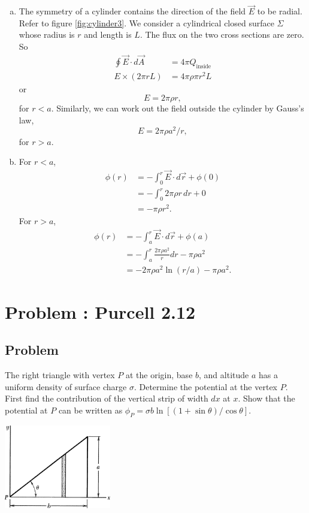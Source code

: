 \documentclass[solutions]{esg8022pset}
\begin{document}
  \begin{enumerate}[(a)]
    \item The symmetry of a cylinder contains the direction of the field
      $\vec{E}$ to be radial.  Refer to figure \ref{fig:cylinder3}.  We
      consider a cylindrical closed surface $\Sigma$ whose radius is $r$ and
      length is $L$.  The flux on the two cross sections are zero.  So
      \begin{align*}
        \oint \vec{E}\cdot d\vec{A} & = 4\pi Q_{\text{inside}}\\
        E\times(2\pi rL) & = 4\pi\rho\pi r^2L
      \end{align*}
      or
      \begin{equation*}
      E=2\pi\rho r,
      \end{equation*}
      for $r<a$.  Similarly, we can work out the field outside the cylinder
      by Gauss's law,
      \begin{equation*}
      E=2\pi\rho a^2/r,
      \end{equation*}
      for $r>a$.
    \item For $r<a$,
      \begin{align*}
        \phi(r) & = -\int_0^r\vec{E}\cdot d\vec{r}+\phi(0)\\
                & = -\int_0^r 2\pi\rho r\,dr+0\\
                & = -\pi\rho r^2.
      \end{align*}
      For $r>a$,
      \begin{align*}
        \phi(r) & = -\int_a^r \vec{E}\cdot d\vec{r}+\phi(a)\\
                & = -\int_a^r\frac{2\pi\rho a^2}{r}dr-\pi\rho a^2\\
                & = -2\pi\rho a^2\ln{(r/a)}-\pi\rho a^2.
      \end{align*}
  \end{enumerate}
\section{Problem \thesection: Purcell 2.12}
\subsection{Problem}
  The right triangle with vertex $P$ at the origin, base $b$, and altitude $a$ has a uniform density of surface charge $\sigma$. Determine the potential at the vertex $P$. First find the contribution of the vertical strip of width $dx$ at $x$. Show that the potential at $P$ can be written as $\phi_P = \sigma b \ln[(1 + \sin \theta) / \cos \theta]$.
  \begin{center}\includegraphics[width=0.35\textwidth]{ps02_3}\end{center}
\end{document}

